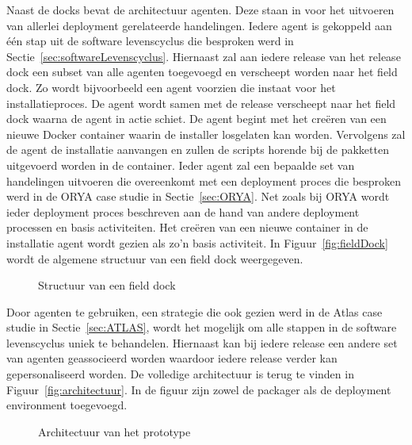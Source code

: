 Naast de docks bevat de architectuur agenten.
Deze staan in voor het uitvoeren van allerlei deployment gerelateerde handelingen.
Iedere agent is gekoppeld aan één stap uit de software levenscyclus die besproken werd in Sectie~\vref{sec:softwareLevenscyclus}.
Hiernaast zal aan iedere release van het release dock een subset van alle agenten toegevoegd en verscheept worden naar het field dock.
Zo wordt bijvoorbeeld een agent voorzien die instaat voor het installatieproces.
De agent wordt samen met de release verscheept naar het field dock waarna de agent in actie schiet.
De agent begint met het creëren van een nieuwe Docker container waarin de installer losgelaten kan worden.
Vervolgens zal de agent de installatie aanvangen en zullen de scripts horende bij de pakketten uitgevoerd worden in de container.
Ieder agent zal een bepaalde set van handelingen uitvoeren die overeenkomt met een deployment proces die besproken werd in de ORYA case studie in Sectie~\vref{sec:ORYA}.
Net zoals bij ORYA wordt ieder deployment proces beschreven aan de hand van andere deployment processen en basis activiteiten.
Het creëren van een nieuwe container in de installatie agent wordt gezien als zo'n basis activiteit.
In Figuur~\vref{fig:fieldDock} wordt de algemene structuur van een field dock weergegeven.

\begin{figure}[!ht]
\centering
{}
\caption{Structuur van een field dock}
\label{fig:fieldDock}
\end{figure}

Door agenten te gebruiken, een strategie die ook gezien werd in de Atlas case studie in Sectie~\vref{sec:ATLAS}, wordt het mogelijk om alle stappen in de software levenscyclus uniek te behandelen.
Hiernaast kan bij iedere release een andere set van agenten geassocieerd worden waardoor iedere release verder kan gepersonaliseerd worden.
De volledige architectuur is terug te vinden in Figuur~\vref{fig:architectuur}.
In de figuur zijn zowel de packager als de deployment environment toegevoegd.

\begin{figure}[!ht]
\centering
{}
\caption{Architectuur van het prototype}
\label{fig:architectuur}
\end{figure}

